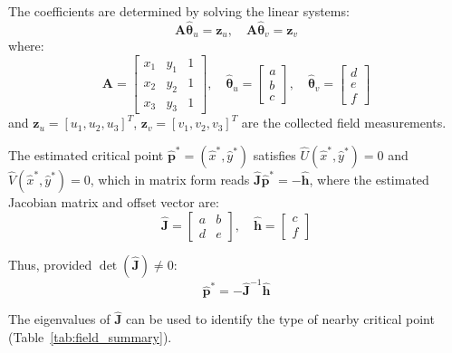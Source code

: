 \documentclass[lettersize,journal]{IEEEtran}
\begin{document}
The coefficients are determined by solving the linear systems:
\begin{equation}\label{eq:4}
\mathbf{A}\hat{\boldsymbol{\theta}}_u = \mathbf{z}_u, \quad \mathbf{A}\hat{\boldsymbol{\theta}}_v = \mathbf{z}_v
\end{equation}
where:
\begin{equation}\label{eq:5}
\mathbf{A} = \begin{bmatrix} x_1 & y_1 & 1 \\ x_2 & y_2 & 1 \\ x_3 & y_3 & 1 \end{bmatrix}, \quad \hat{\boldsymbol{\theta}}_u = \begin{bmatrix} a \\ b \\ c \end{bmatrix}, \quad \hat{\boldsymbol{\theta}}_v = \begin{bmatrix} d \\ e \\ f \end{bmatrix}
\end{equation}
and $\mathbf{z}_u = [u_1, u_2, u_3]^T$, $\mathbf{z}_v = [v_1, v_2, v_3]^T$ are the collected field measurements.

The estimated critical point $\hat{\mathbf{p}}^* = (\hat{x}^*, \hat{y}^*)$ satisfies $\hat{U}(\hat{x}^*, \hat{y}^*) = 0$ and $\hat{V}(\hat{x}^*, \hat{y}^*) = 0$, which in matrix form reads $\hat{\mathbf{J}}\hat{\mathbf{p}}^* = -\hat{\mathbf{h}}$, where the estimated Jacobian matrix and offset vector are:
\begin{equation}\label{eq:8}
\hat{\mathbf{J}} = \begin{bmatrix} a & b \\ d & e \end{bmatrix}, \quad \hat{\mathbf{h}} = \begin{bmatrix} c \\ f \end{bmatrix}
\end{equation}

Thus, provided $\det(\hat{\mathbf{J}}) \neq 0$:
\begin{equation}\label{eq:9}
\hat{\mathbf{p}}^* = -\hat{\mathbf{J}}^{-1}\hat{\mathbf{h}}
\end{equation}

The eigenvalues of $\hat{\mathbf{J}}$ can be used to identify the type of nearby critical point (Table~\ref{tab:field_summary}).
\end{document}
